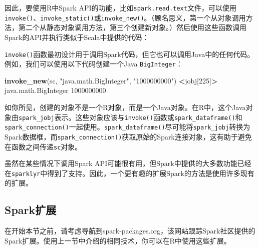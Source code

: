 \documentclass[
]{article}
\newenvironment{Shaded}{\begin{snugshade}}{\end{snugshade}}
\newcommand{\DecValTok}[1]{\textcolor[rgb]{0.00,0.00,0.81}{#1}}
\newcommand{\KeywordTok}[1]{\textcolor[rgb]{0.13,0.29,0.53}{\textbf{#1}}}
\newcommand{\NormalTok}[1]{#1}
\newcommand{\OperatorTok}[1]{\textcolor[rgb]{0.81,0.36,0.00}{\textbf{#1}}}
\newcommand{\StringTok}[1]{\textcolor[rgb]{0.31,0.60,0.02}{#1}}
\begin{document}
因此，要使用R中Spark
API的功能，比如\texttt{spark.read.text}文件，可以使用\texttt{invoke()}、\texttt{invoke\_static()}或\texttt{invoke\_new()}。（顾名思义，第一个从对象调用方法，第二个从静态对象调用方法，第三个创建新对象。）然后使用这些函数调用Spark的API并执行类似于Scala中提供的代码：

\begin{Shaded}
\end{Shaded}

\texttt{invoke()}函数最初设计用于调用Spark代码，但它也可以调用Java中的任何代码。例如，我们可以使用以下代码创建一个Java
\texttt{BigInteger}：

\begin{Shaded}
\begin{Highlighting}[]
\KeywordTok{invoke_new}\NormalTok{(sc, }\StringTok{"java.math.BigInteger"}\NormalTok{, }\StringTok{"1000000000"}\NormalTok{)}
\OperatorTok{<}\NormalTok{jobj[}\DecValTok{225}\NormalTok{]}\OperatorTok{>}
\NormalTok{java.math.BigInteger}
\DecValTok{1000000000}
\end{Highlighting}
\end{Shaded}

如你所见，创建的对象不是一个R对象，而是一个Java对象。在R中，这个Java对象由\texttt{spark\_jobj}表示。这些对象应该与\texttt{invoke()}函数或\texttt{spark\_dataframe()}和\texttt{spark\_connection()}一起使用。\texttt{spark\_dataframe()}尽可能将\texttt{spark\_jobj}转换为Spark数据框，而\texttt{spark\_connection()}获取原始的Spark连接对象，这有助于避免在函数之间传递\texttt{sc}对象。

虽然在某些情况下调用Spark
API可能很有用，但Spark中提供的大多数功能已经在\texttt{sparklyr}中得到了支持。因此，一个更有趣的扩展Spark的方法是使用许多现有的扩展。

\hypertarget{sparkux6269ux5c55}{%
\subsection{Spark扩展}\label{sparkux6269ux5c55}}

在开始本节之前，请考虑导航到spark-packages.org，该网站跟踪Spark社区提供的Spark扩展。使用上一节中介绍的相同技术，你可以在R中使用这些扩展。
\end{document}
